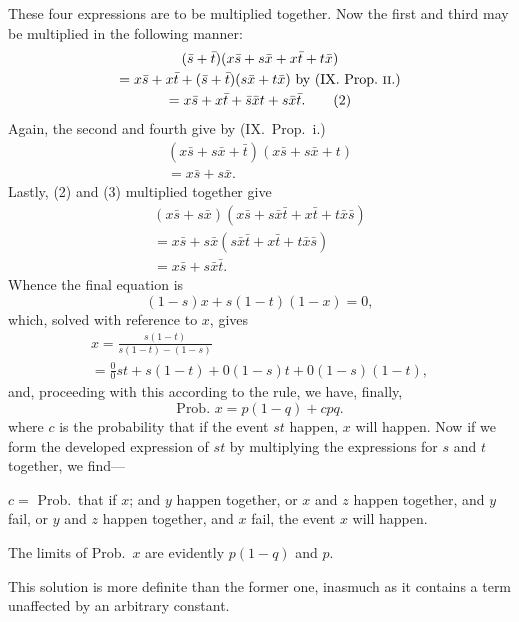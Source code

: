 \documentclass[oneside]{book}
\begin{document}
These four expressions are to be multiplied together. Now
the first and third may be multiplied in the following manner:
\begin{gather*}
(\bar{s} +\bar{t}) (x\bar{s} + s\bar{x} + x\bar{t} + t\bar{x})\\
= x\bar{s} + x\bar{t} + (\bar{s} + \bar{t}) (s\bar{x} + t\bar{x})\text { by (IX.~Prop.~{\sc ii}.)}\\
= x\bar{s} + x\bar{t} + \bar{s}\bar{x}t + s\bar{x}\bar{t}.       \tag{2}
\end{gather*}
Again, the second and fourth give by (IX.~Prop.~{\sc i}.)
\begin{gather*}
(x\bar{s} + s\bar{x} + \bar{t}) (x\bar{s} + s\bar{x} + t)\\
= x\bar{s} + s\bar{x}.           \tag{3}
\end{gather*}
Lastly, (2) and (3) multiplied together give
\begin{gather*}
(x\bar{s} + s\bar{x}) (x\bar{s} + s\bar{x}\bar{t} + x\bar{t} + t\bar{x}\bar{s})\\
= x\bar{s} + s\bar{x} (s\bar{x}\bar{t}+ x\bar{t} + t\bar{x}\bar{s})\\
= x \bar{s} + s \bar{x}\bar{t}.
\end{gather*}
Whence the final equation is
\[(1-s)x +s(1-t)(1-x)=0,    \]
which, solved with reference to $x$, gives
\begin{gather*}
x =\frac{s(1-t)}{s(1-t)-(1-s)} \\
= \frac{0}{0}st +s(1-t)+0(1-s)t +0(1-s)(1-t)  ,
\end{gather*}
and, proceeding with this according to the rule, we have, finally,
\begin{equation*}
  \text{Prob. }x = p (1-q) + cpq.      \tag{4}
\end{equation*}
where $c$ is the probability that if the event $st$ happen, $x$ will
happen. Now if we form the developed expression of $st$ by multiplying
the expressions for $s$ and $t$ together, we find---

$c =$ Prob.\ that if $x$; and $y$ happen together, or $x$ and $z$ happen
together, and $y$ fail, or $y$ and $z$ happen together, and $x$ fail, the
event $x$ will happen.

The limits of Prob.\ $x$ are evidently $p (1 - q)$ and $p$.

This solution is more definite than the former one, inasmuch
as it contains a term unaffected by an arbitrary constant.
\end{document}
